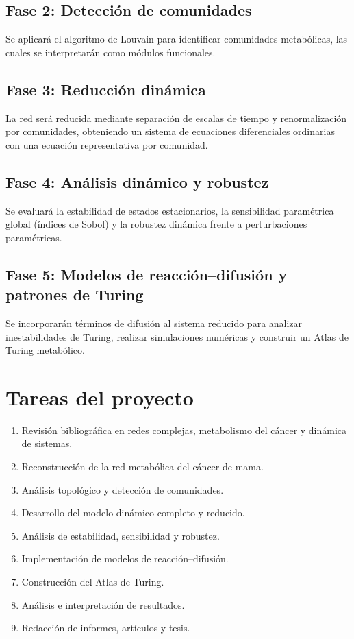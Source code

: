 \documentclass[12pt,spanish]{article}
\begin{document}
	\subsection{Fase 2: Detección de comunidades}
	
	Se aplicará el algoritmo de Louvain para identificar comunidades metabólicas, las cuales se interpretarán como módulos funcionales.
	
	\subsection{Fase 3: Reducción dinámica}
	
	La red será reducida mediante separación de escalas de tiempo y renormalización por comunidades, obteniendo un sistema de ecuaciones diferenciales ordinarias con una ecuación representativa por comunidad.
	
	\subsection{Fase 4: Análisis dinámico y robustez}
	
	Se evaluará la estabilidad de estados estacionarios, la sensibilidad paramétrica global (índices de Sobol) y la robustez dinámica frente a perturbaciones paramétricas.
	
	\subsection{Fase 5: Modelos de reacción--difusión y patrones de Turing}
	
	Se incorporarán términos de difusión al sistema reducido para analizar inestabilidades de Turing, realizar simulaciones numéricas y construir un Atlas de Turing metabólico.
	
	\section{Tareas del proyecto}
	
	\begin{enumerate}
		\item Revisión bibliográfica en redes complejas, metabolismo del cáncer y dinámica de sistemas.
		\item Reconstrucción de la red metabólica del cáncer de mama.
		\item Análisis topológico y detección de comunidades.
		\item Desarrollo del modelo dinámico completo y reducido.
		\item Análisis de estabilidad, sensibilidad y robustez.
		\item Implementación de modelos de reacción--difusión.
		\item Construcción del Atlas de Turing.
		\item Análisis e interpretación de resultados.
		\item Redacción de informes, artículos y tesis.
	\end{enumerate}
	
\end{document}
